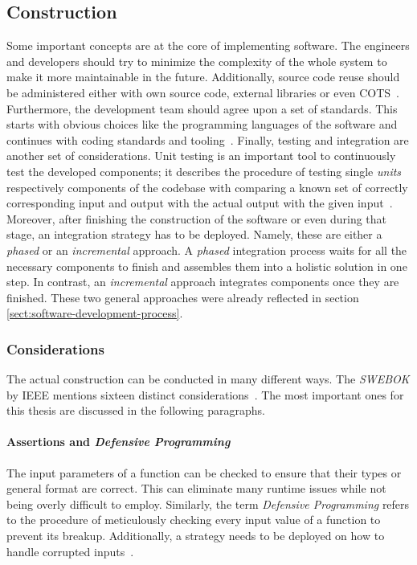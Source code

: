 \documentclass[12pt,a4paper,twoside]{report}
\begin{document}
\subsection{Construction} \label{subsect:construction}

Some important concepts are at the core of implementing software.
The engineers and developers should try to minimize the complexity of the whole system
to make it more maintainable in the future.
Additionally, source code reuse should be administered either with own source code,
external libraries or even COTS~\cite{swebok}.
Furthermore, the development team should agree upon a set of standards.
This starts with obvious choices like the programming languages of the software
and continues with coding standards and tooling~\cite{mcconnell-code-complete}.
Finally, testing and integration are another set of considerations.
Unit testing is an important tool to continuously test the developed components;
it describes the procedure of testing single \textit{units} respectively components
of the codebase with comparing a known set of correctly corresponding input and output
with the actual output with the given input~\cn.
Moreover, after finishing the construction of the software or even during that stage,
an integration strategy has to be deployed. Namely, these are either a
\textit{phased} or an \textit{incremental} approach. A \textit{phased} integration
process waits for all the necessary components to finish and assembles them into a
holistic solution in one step. In contrast, an \textit{incremental} approach
integrates components once they are finished. These two general approaches
were already reflected in section \ref{sect:software-development-process}.

\subsubsection{Considerations}
The actual construction can be conducted in many different ways.
The \textit{SWEBOK} by IEEE mentions sixteen distinct considerations~\cite{swebok}.
The most important ones for this thesis are discussed in the following paragraphs.

\paragraph{Assertions and \textit{Defensive Programming}}
The input parameters of a function can be checked to ensure that their types
or general format are correct. This can eliminate many runtime issues while not
being overly difficult to employ. Similarly, the term \textit{Defensive Programming}
refers to the procedure of meticulously checking every input value of a function
to prevent its breakup. Additionally, a strategy needs to be deployed on how to
handle corrupted inputs~\cite{swebok}.
\end{document}
